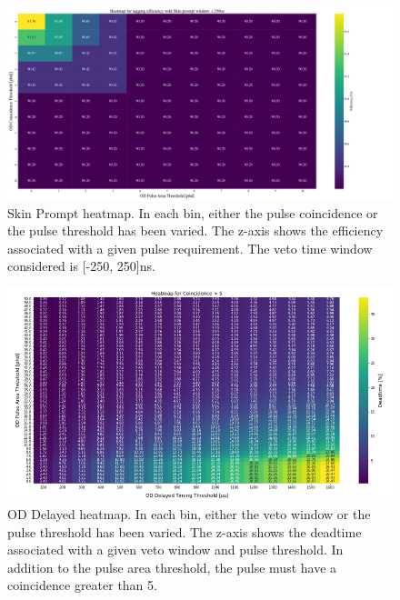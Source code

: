 \begin{figure}
    \centering
    \includegraphics[width=\textwidth]{figures/VetoEfficiency/HeatmapSkinPACoinScanWindow500.pdf}
    \caption{Skin Prompt heatmap.
    In each bin, either the pulse coincidence or the pulse threshold has been varied.
    The z-axis shows the efficiency associated with a given pulse requirement.
    The veto time window considered is [-250, 250]ns.}
    \label{fig:skin_prompt_veto_heatmap}
\end{figure}
\begin{figure}
    \centering
    \includegraphics[width=\textwidth]{figures/VetoEfficiency/HeatMapOD_PA_ScanWindow_deadtime.png}
    \caption{OD Delayed heatmap.
    In each bin, either the veto window or the pulse threshold has been varied.
    The z-axis shows the deadtime associated with a given veto window and pulse threshold.
    In addition to the pulse area threshold, the pulse must have a coincidence greater than 5.}
    \label{fig:od_delayed_veto_heatmap}
\end{figure}
